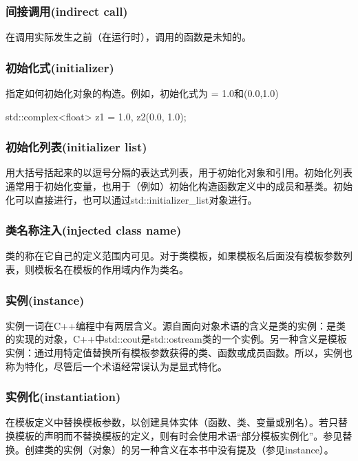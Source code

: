 \subsubsection{间接调用(indirect call)}

在调用实际发生之前（在运行时），调用的函数是未知的。

\subsubsection{初始化式(initializer)}

指定如何初始化对象的构造。例如，初始化式为 = 1.0和(0.0,1.0)
\begin{cpp}
std::complex<float> z1 = 1.0, z2(0.0, 1.0);
\end{cpp}

\subsubsection{初始化列表(initializer list)}

用大括号括起来的以逗号分隔的表达式列表，用于初始化对象和引用。初始化列表通常用于初始化变量，也用于（例如）初始化构造函数定义中的成员和基类。初始化可以直接进行，也可以通过std::initializer\_list对象进行。

\subsubsection{类名称注入(injected class name)}

类的称在它自己的定义范围内可见。对于类模板，如果模板名后面没有模板参数列表，则模板名在模板的作用域内作为类名。

\subsubsection{实例(instance)}

实例一词在C++编程中有两层含义。源自面向对象术语的含义是类的实例：是类的实现的对象，C++中std::cout是std::ostream类的一个实例。另一种含义是模板实例：通过用特定值替换所有模板参数获得的类、函数或成员函数。所以，实例也称为特化，尽管后一个术语经常误认为是显式特化。

\subsubsection{实例化(instantiation)}

在模板定义中替换模板参数，以创建具体实体（函数、类、变量或别名）。若只替换模板的声明而不替换模板的定义，则有时会使用术语“部分模板实例化”。参见替换。创建类的实例（对象）的另一种含义在本书中没有提及（参见instance）。


